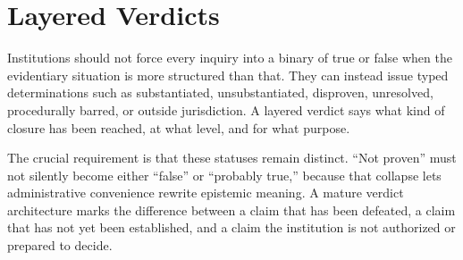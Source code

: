 
\chapter{Layered Verdicts}
\label{ch:ch098}

Institutions should not force every inquiry into a binary of true or false when the evidentiary situation is more structured than that. They can instead issue typed determinations such as substantiated, unsubstantiated, disproven, unresolved, procedurally barred, or outside jurisdiction. A layered verdict says what kind of closure has been reached, at what level, and for what purpose.

The crucial requirement is that these statuses remain distinct. ``Not proven'' must not silently become either ``false'' or ``probably true,'' because that collapse lets administrative convenience rewrite epistemic meaning. A mature verdict architecture marks the difference between a claim that has been defeated, a claim that has not yet been established, and a claim the institution is not authorized or prepared to decide.
